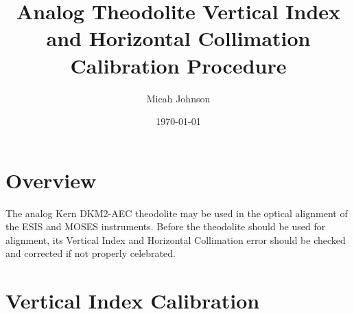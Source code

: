 \documentclass[a4paper,12pt]{article}
\begin{document}
\title{Analog Theodolite Vertical Index and Horizontal Collimation Calibration Procedure}
\author{Micah Johnson}
\date{\today}
\maketitle

\section*{Overview}
The analog Kern DKM2-AEC theodolite may be used in the optical alignment of the ESIS and MOSES instruments. Before the theodolite should be used for alignment, its Vertical Index and Horizontal Collimation error should be checked and corrected if not properly celebrated.

\section*{Vertical Index Calibration}
\end{document}
